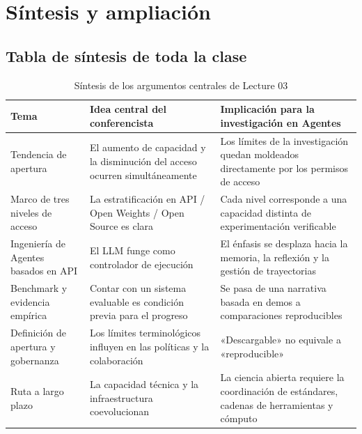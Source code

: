 \section{Síntesis y ampliación}

\subsection{Tabla de síntesis de toda la clase}
\begin{table}[H]
\centering
\begin{tabular}{p{2.8cm}p{4.1cm}p{4.6cm}}
\toprule
\textbf{Tema} & \textbf{Idea central del conferencista} & \textbf{Implicación para la investigación en Agentes} \\
\midrule
Tendencia de apertura & El aumento de capacidad y la disminución del acceso ocurren simultáneamente & Los límites de la investigación quedan moldeados directamente por los permisos de acceso \\
Marco de tres niveles de acceso & La estratificación en API / Open Weights / Open Source es clara & Cada nivel corresponde a una capacidad distinta de experimentación verificable \\
Ingeniería de Agentes basados en API & El LLM funge como controlador de ejecución & El énfasis se desplaza hacia la memoria, la reflexión y la gestión de trayectorias \\
Benchmark y evidencia empírica & Contar con un sistema evaluable es condición previa para el progreso & Se pasa de una narrativa basada en demos a comparaciones reproducibles \\
Definición de apertura y gobernanza & Los límites terminológicos influyen en las políticas y la colaboración & «Descargable» no equivale a «reproducible» \\
Ruta a largo plazo & La capacidad técnica y la infraestructura coevolucionan & La ciencia abierta requiere la coordinación de estándares, cadenas de herramientas y cómputo \\
\bottomrule
\end{tabular}
\caption{Síntesis de los argumentos centrales de Lecture 03}
\end{table}

